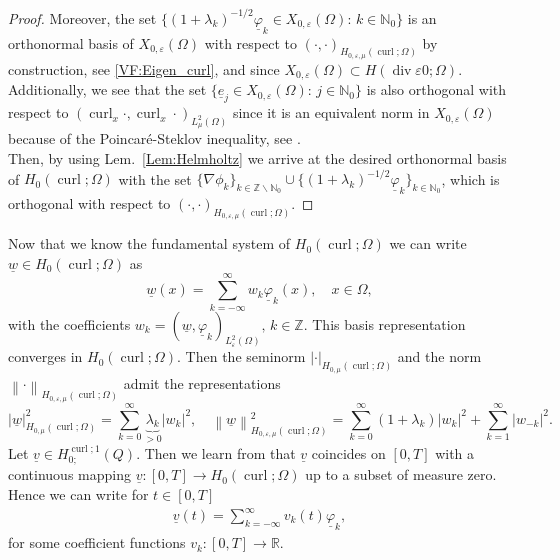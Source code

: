 \documentclass[a4paper,11pt]{article}
\newcommand{\N}{\mathbb N}
\newcommand{\Z}{\mathbb Z}
\newcommand{\R}{\mathbb R}
\newcommand{\cu}{\operatorname{curl}}
\newcommand{\di}{\operatorname{div}}
\renewcommand{\vec}[1]{\underline{#1}}
\newcommand{\abs}[1]{\left\lvert{#1}\right\rvert}
\newcommand{\norm}[1]{{\left\lVert{#1}\right\rVert}}
\begin{document}
\begin{proof}
	Moreover, the set $\{( 1+\lambda_k)^{-1/2} \vec \varphi_k \in X_{0,\varepsilon}(\Omega): \, k\in \N_0 \}$ is an orthonormal basis of $X_{0,\varepsilon}(\Omega)$ with respect to $(\cdot, \cdot)_{H_{0,\varepsilon,\mu}(\cu;\Omega)}$ by construction, see \eqref{VF:Eigen_curl}, and since $X_{0,\varepsilon}(\Omega)\subset  H(\di \varepsilon 0;\Omega)$. Additionally, we see that the set $\{ \vec e_j \in X_{0,\varepsilon}(\Omega) : \, j \in \N_0 \}$ is also orthogonal with respect to $(\cu_x \cdot,\cu_x  \cdot)_{L^2_\mu(\Omega)}$ since it is an equivalent norm in $X_{0,\varepsilon}(\Omega)$ because of the Poincar\'{e}-Steklov inequality, see  \cite[Lem.~44.4]{ErnGuermond2020II}.\\
	Then, by using  Lem.~\ref{Lem:Helmholtz} we arrive at the desired orthonormal basis of $ H_0(\cu;\Omega)$ with the set $\{ \nabla \phi_k\}_{ k \in \Z\backslash\N_0 }\cup\{( 1+\lambda_k)^{-1/2} \vec \varphi_k\}_{ k \in\N_0 } $, which is orthogonal with respect to $(\cdot, \cdot)_{H_{0,\varepsilon,\mu}(\cu;\Omega)}$.	
\end{proof}
Now that we know the fundamental system of $H_0(\cu;\Omega)$ we can write $\vec w \in H_0(\cu;\Omega)$ as
\begin{equation*}
	\vec w(x) = \sum_{k=-\infty}^\infty w_k \vec \varphi_k(x), \quad x \in \Omega,
\end{equation*}
with the coefficients $w_k = (\vec w, \vec \varphi_k)_{L^2_\varepsilon(\Omega)}, \, k \in \Z.$ This basis representation converges in $H_0(\cu;\Omega).$  Then the seminorm $\abs{\cdot}_{H_{0,\mu}(\cu;\Omega)}$ and the norm $\norm{\cdot}_{H_{0,\varepsilon,\mu}(\cu;\Omega)}$ admit the representations
\begin{equation} \label{VF:H0mucurl}
	\abs{\vec w}_{H_{0,\mu}(\cu;\Omega)}^2 = \sum_{k=0}^\infty \underbrace{\lambda_k}_{> 0} \abs{w_k}^2, \quad  \norm{\vec w}_{H_{0,\varepsilon,\mu}(\cu;\Omega)}^2 = \sum_{k=0}^\infty (1+\lambda_k) \abs{w_k}^2 + \sum_{k=1}^\infty \abs{w_{-k}}^2.
\end{equation}
Let $\vec v\in H^{\cu;1}_{0;}(Q)$. Then we learn from \cite[Prop.~23.23]{zeidler} that $\vec v$ coincides on $[0,T]$ with a continuous mapping $ \vec v:[0,T]\to H_0(\cu;\Omega)$  up to a subset of measure zero. Hence we can write for $t\in[0,T]$
\begin{align}\label{eq:BasisRepresentation}
	\vec v(t) =  \sum_{k=-\infty}^\infty v_k(t) \vec \varphi_k, 
\end{align}
for some coefficient functions $v_k:[0,T]\to \R$.
\end{document}
